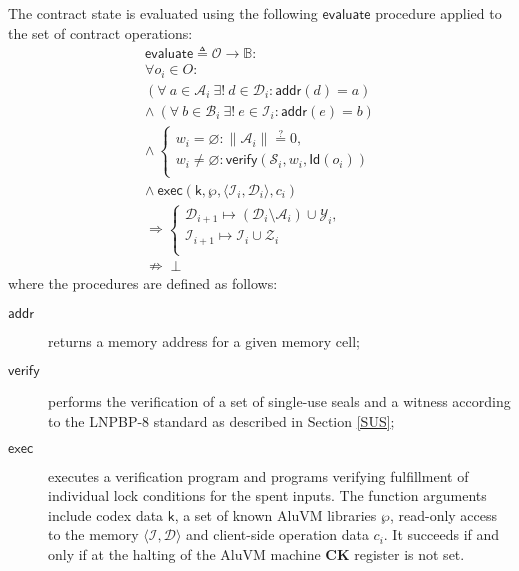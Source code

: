 \documentclass[9pt,oneside]{amsart}
\begin{document}
\begin{multicols}{2}
The contract state is evaluated using the following $\mathsf{evaluate}$
procedure applied to the set of contract operations:
\noindent
\begin{equation}\label{eq:evaluate}
\begin{split}
\mathsf{evaluate} \triangleq \mathcal{O} \rightarrow \mathbb{B}: \\
\forall o_i \in O: \\
(\forall \ a \in \mathcal{A}_i \ \exists! \ d \in \mathcal{D}_i: \mathsf{addr}(d) = a) \\
\wedge \ (\forall \ b \in \mathcal{B}_i \ \exists! \ e \in \mathcal{I}_i: \mathsf{addr}(e) = b) \\
\wedge \ 
\begin{cases}
    w_i = \varnothing : \|\mathcal{A}_i\| \stackrel{?}{=} 0, \\
    w_i \neq \varnothing : \mathsf{verify}(\mathcal{S}_i, w_i, \mathsf{Id}(o_i)) \\
\end{cases} \\
\wedge \ \mathsf{exec}(\mathsf{k}, \wp, \langle \mathcal{I}_i, \mathcal{D}_i \rangle, c_i) \\
\Rightarrow 
\begin{cases}
    \mathcal{D}_{i+1} \mapsto (\mathcal{D}_i \setminus \mathcal{A}_i) \cup \mathcal{Y}_i, \\[6pt]
    \mathcal{I}_{i+1} \mapsto \mathcal{I}_i \cup \mathcal{Z}_i \\
\end{cases} \\
\nRightarrow \perp
\end{split}
\end{equation}
\noindent
where the procedures are defined as follows:
\noindent
\begin{description}
    \item[$\mathsf{addr}$] returns a memory address for a given memory cell;
    \item[$\mathsf{verify}$] performs the verification of a set of single-use seals and a witness
        according to the LNPBP-8 standard \cite{LNPBP8} as described in Section \ref{SUS};
    \item[$\mathsf{exec}$] executes a verification program
        and programs verifying fulfillment of individual lock conditions for the spent inputs.
        The function arguments include codex data $\mathsf{k}$, a set of known AluVM libraries $\wp$,
        read-only access to the memory $\langle \mathcal{I}, \mathcal{D} \rangle$
        and client-side operation data $c_i$.
        It succeeds if and only if at the halting of the AluVM machine
        \textbf{CK} register is not set.
\end{description}


\end{multicols}
\end{document}
